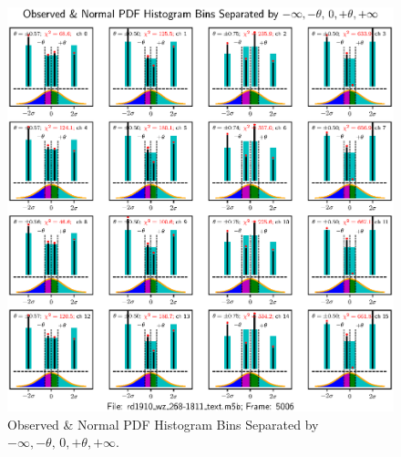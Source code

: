 \documentclass[letterpaper,twoside,12pt]{article}
\begin{document}
\begin{figure}[ht!]
  \begin{center}
  \includegraphics[width=35pc]{fig_4x4_Histograms_text_inserted.eps}
  \caption{\small Observed \& Normal PDF Histogram Bins Separated by $-\infty, -\theta, \, 0, +\theta, +\infty$.}
  \label{hists_text_4x4}
  \end{center}
\end{figure}
\end{document}
